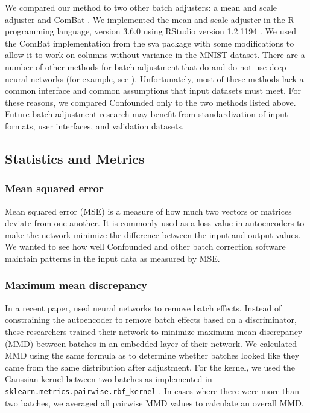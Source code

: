 \documentclass[notitlepage]{article}
\begin{document}
We compared our method to two other batch adjusters: a mean and scale adjuster and ComBat \citep{johnson_adjusting_2007}.
We implemented the mean and scale adjuster in the R programming language, version 3.6.0 \citep{r_core_team_r_2014} using RStudio version 1.2.1194 \citep{rstudio_team_rstudio_2018}.
We used the ComBat implementation from the sva package \citep{leek_sva_2017} with some modifications to allow it to work on columns without variance in the MNIST dataset.
There are a number of other methods for batch adjustment that do and do not use deep neural networks (for example, see \citep{leek_capturing_2007,espin-perez_comparison_2018,shaham_removal_2017,shaham_batch_2018}). %
Unfortunately, most of these methods lack a common interface and common assumptions that input datasets must meet.
For these reasons, we compared Confounded only to the two methods listed above.
Future batch adjustment research may benefit from standardization of input formats, user interfaces, and validation datasets.

\subsection{Statistics and Metrics}

\subsubsection{Mean squared error}

Mean squared error (MSE) is a measure of how much two vectors or matrices deviate from one another.
It is commonly used as a loss value in autoencoders to make the network minimize the difference between the input and output values.
We wanted to see how well Confounded and other batch correction software maintain patterns in the input data as measured by MSE.

\subsubsection{Maximum mean discrepancy} \label{section:mmd}

In a recent paper, \citet{shaham_removal_2017} used neural networks to remove batch effects.
Instead of constraining the autoencoder to remove batch effects based on a discriminator, these researchers trained their network to minimize maximum mean discrepancy (MMD) between batches in an embedded layer of their network.
We calculated MMD using the same formula as \citeauthor{shaham_removal_2017} to determine whether batches looked like they came from the same distribution after adjustment.
For the kernel, we used the Gaussian kernel between two batches as implemented in \texttt{sklearn.metrics.pairwise.rbf\_kernel} \cite{pedregosa_scikit-learn_2011}.
In cases where there were more than two batches, we averaged all pairwise MMD values to calculate an overall MMD.
\end{document}
